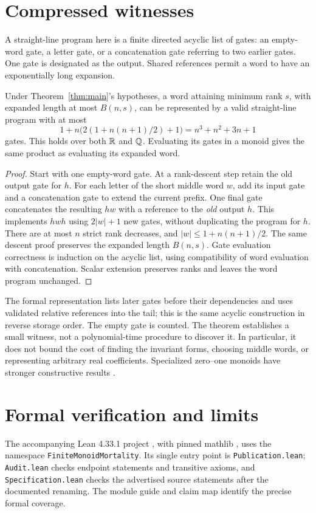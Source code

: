 \section{Compressed witnesses}\label{sec:slp}
A straight-line program here is a finite directed acyclic list of gates: an empty-word gate, a letter gate, or a concatenation gate referring to two earlier gates. One gate is designated as the output. Shared references permit a word to have an exponentially long expansion.

\begin{theorem}\label{thm:slp}
Under Theorem~\ref{thm:main}'s hypotheses, a word attaining minimum rank \(s\), with expanded length at most \(B(n,s)\), can be represented by a valid straight-line program with at most
\[
 1+n\bigl(2(1+n(n+1)/2)+1\bigr)=n^3+n^2+3n+1
\]
gates. This holds over both \(\mathbb R\) and \(\mathbb Q\). Evaluating its gates in a monoid gives the same product as evaluating its expanded word.
\end{theorem}
\begin{proof}
Start with one empty-word gate. At a rank-descent step retain the old output gate for \(h\). For each letter of the short middle word \(w\), add its input gate and a concatenation gate to extend the current prefix. One final gate concatenates the resulting \(hw\) with a reference to the \emph{old} output \(h\). This implements \(hwh\) using \(2|w|+1\) new gates, without duplicating the program for \(h\). There are at most \(n\) strict rank decreases, and \(|w|\leq1+n(n+1)/2\). The same descent proof preserves the expanded length \(B(n,s)\). Gate evaluation correctness is induction on the acyclic list, using compatibility of word evaluation with concatenation. Scalar extension preserves ranks and leaves the word program unchanged.
\end{proof}
The formal representation lists later gates before their dependencies and uses validated relative references into the tail; this is the same acyclic construction in reverse storage order. The empty gate is counted. The theorem establishes a small witness, not a polynomial-time procedure to discover it. In particular, it does not bound the cost of finding the invariant forms, choosing middle words, or representing arbitrary real coefficients. Specialized zero--one monoids have stronger constructive results \cite{KR2025}.

\section{Formal verification and limits}
The accompanying Lean 4.33.1 project \cite{Lean}, with pinned mathlib \cite{Mathlib}, uses the namespace \texttt{FiniteMonoidMortality}. Its single entry point is \texttt{Publication.lean}; \texttt{Audit.lean} checks endpoint statements and transitive axioms, and \texttt{Specification.lean} checks the advertised source statements after the documented renaming. The module guide and claim map identify the precise formal coverage.

